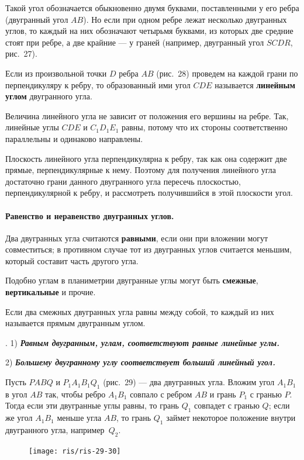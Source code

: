 \documentclass[twoside]{book}
\begin{document}
Такой угол обозначается обыкновенно двумя буквами, поставленными у его ребра (двугранный угол $AB$).
Но если при одном ребре лежат несколько двугранных углов, то каждый на них обозначают четырьмя буквами, из которых две средние стоят при ребре, а две крайние --- у граней (например, двугранный угол $SCDR$, рис.~27).

Если из произвольной точки $D$ ребра $AB$ (рис.~28) проведем на каждой грани по перпендикуляру к ребру, то образованный ими угол $CDE$ называется \textbf{линейным углом} двугранного угла.

Величина линейного угла не зависит от положения его вершины на ребре.
Так, линейные углы $CDE$ и $C_1D_1E_1$ равны, потому что их стороны соответственно параллельны и одинаково направлены.

Плоскость линейного угла перпендикулярна к ребру, так как она содержит две прямые, перпендикулярные к нему.
Поэтому для получения линейного угла достаточно грани данного двугранного угла пересечь плоскостью, перпендикулярной к ребру, и рассмотреть получившийся в этой плоскости угол.

\paragraph{Равенство и неравенство двугранных углов.}\label{1938/s39}
Два двугранных угла считаются \textbf{равными}, если они при вложении могут совместиться;
в противном случае тот из двугранных углов считается меньшим, который составит часть другого угла.

Подобно углам в планиметрии двугранные углы могут быть \textbf{смежные}, \textbf{вертикальные} и прочие.

Если два смежных двугранных угла равны между собой, то каждый из них называется прямым двугранным углом.

.
1) \textbf{\emph{Равным двугранным, углам, соответствуют равные линейные углы.}}

2) \textbf{\emph{Большему двугранному углу соответствует больший линейный угол.}}

Пусть $PABQ$ и $P_1A_1B_1Q_1$ (рис.~29) --- два двугранных угла.
Вложим угол $A_1B_1$ в угол $AB$ так, чтобы ребро $A_1B_1$ совпало с ребром $AB$ и грань $P_1$ с гранью $P$.
Тогда если эти двугранные углы равны, то грань $Q_1$ совпадет с гранью $Q$;
если же угол $A_1B_1$ меньше угла $AB$, то грань $Q_1$ займет некоторое положение внутри двугранного угла, например~$Q_2$.

\begin{figure}[h!]
\centering
\texttt{[image: ris/ris-29-30]}
\caption{}
\end{figure}
\end{document}
